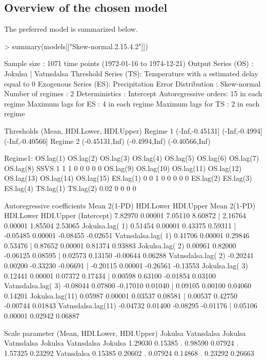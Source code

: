 \subsection{Overview of the chosen model}
The preferred model is summarized below.
\begin{example}
> summary(models[["Skew-normal.2.15.4.2"]])

Sample size          : 1071 time points (1972-01-16 to 1974-12-21)
Output Series (OS)   : Jokulsa    |    Vatnsdalsa
Threshold Series (TS): Temperature with a estimated delay equal to 0
Exogenous Series (ES): Precipitation
Error Distribution   : Skew-normal
Number of regimes    : 2
Deterministics       : Intercept  
Autoregressive orders: 15 in each regime
Maximum lags for ES  : 4 in each regime
Maximum lags for TS  : 2 in each regime

Thresholds (Mean, HDI.Lower, HDI.Upper)
Regime 1 (-Inf,-0.45131] (-Inf,-0.4994] (-Inf,-0.40566]
Regime 2  (-0.45131,Inf)  (-0.4994,Inf)  (-0.40566,Inf)


Regime1:
     OS.lag(1)  OS.lag(2)  OS.lag(3)  OS.lag(4)  OS.lag(5)  OS.lag(6)  OS.lag(7) OS.lag(8) 
SSVS        1          1          1          0          0          0          0         0 
     OS.lag(9) OS.lag(10) OS.lag(11) OS.lag(12) OS.lag(13) OS.lag(14) OS.lag(15) ES.lag(1)
            0          0          1          0          0          0          0         0 
     ES.lag(2)  ES.lag(3)  ES.lag(4)  TS.lag(1)  TS.lag(2)
         0.02          0          0          0          0

Autoregressive coefficients
                      Mean  2(1-PD) HDI.Lower HDI.Upper    Mean  2(1-PD) HDI.Lower HDI.Upper
(Intercept)         7.82970 0.00001  7.05110  8.60872 |  2.16764 0.00001  1.85504  2.53065
Jokulsa.lag( 1)     0.51454 0.00001  0.43375  0.59311 | -0.05485 0.00001 -0.08455 -0.02651
Vatnsdalsa.lag( 1)  0.41706 0.00001  0.29846  0.53476 |  0.87652 0.00001  0.81374  0.93883
Jokulsa.lag( 2)     0.00961 0.82000 -0.06125  0.08595 |  0.02573 0.13150 -0.00644  0.06288
Vatnsdalsa.lag( 2) -0.20241 0.00200 -0.33230 -0.06691 | -0.20115 0.00001 -0.26561 -0.13553
Jokulsa.lag( 3)     0.12441 0.00001  0.07372  0.17434 |  0.00598 0.63100 -0.01854  0.03100
Vatnsdalsa.lag( 3) -0.08044 0.07800 -0.17010  0.01040 |  0.09105 0.00100  0.04060  0.14201
Jokulsa.lag(11)     0.05987 0.00001  0.03537  0.08581 |  0.00537 0.42750 -0.00744  0.01843
Vatnsdalsa.lag(11) -0.04732 0.01400 -0.08295 -0.01176 |  0.05106 0.00001  0.02942  0.06887

Scale parameter (Mean, HDI.Lower, HDI.Upper)
           Jokulsa Vatnsdalsa      Jokulsa Vatnsdalsa      Jokulsa Vatnsdalsa
Jokulsa    1.29030    0.15385    . 0.98590    0.07924    . 1.57325    0.23292
Vatnsdalsa 0.15385    0.20602    . 0.07924    0.14868    . 0.23292    0.26663


\end{example}
